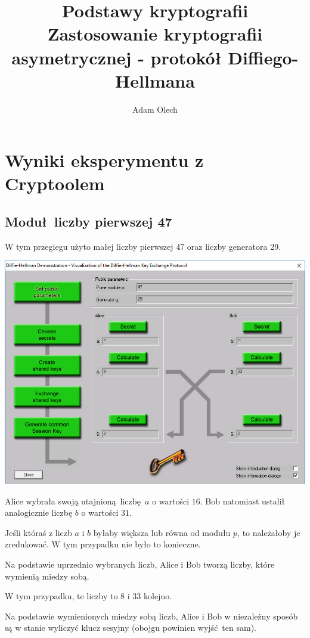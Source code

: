 \documentclass[12pt]{article}
\title{Podstawy kryptografii \\ \large Zastosowanie kryptografii asymetrycznej - protokół Diffiego-Hellmana}
\author{Adam Olech}
\begin{document}
\maketitle

\tableofcontents
\newpage

\section{Wyniki eksperymentu z Cryptoolem}

\subsection{Moduł liczby pierwszej 47}

W tym przegiegu użyto małej liczby pierwszej 47 oraz liczby generatora 29.

\begin{center}
	\includegraphics[scale=0.4]{4-cryptool-1}
\end{center}

Alice wybrała swoją utajnioną liczbę $a$ o wartości $16$.
Bob natomiast ustalił analogicznie liczbę $b$ o wartości $31$.

Jeśli któraś z liczb $a$ i $b$ byłaby większa lub równa od modułu $p$, to należałoby je zredukować.
W tym przypadku nie było to konieczne.

Na podstawie uprzednio wybranych liczb, Alice i Bob tworzą liczby, które wymienią miedzy sobą.

W tym przypadku, te liczby to $8$ i $33$ kolejno.

Na podstawie wymienionych miedzy sobą liczb, Alice i Bob w niezależny sposób są w stanie wyliczyć klucz sesyjny (obojgu powinien wyjść ten sam).
\end{document}
